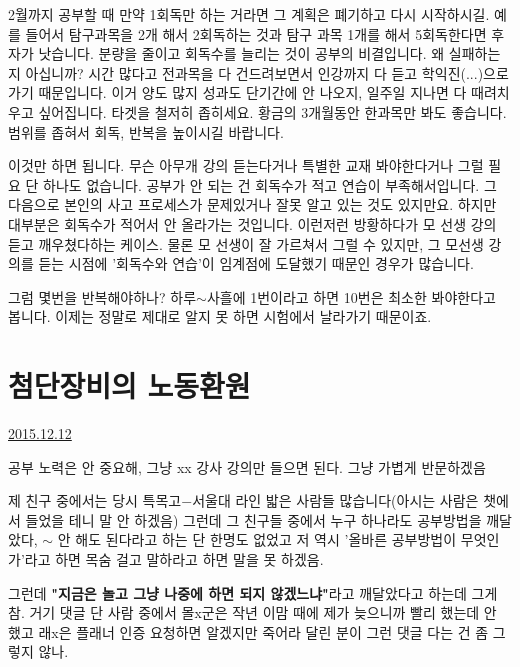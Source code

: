 2월까지 공부할 때 만약 1회독만 하는 거라면 그 계획은 폐기하고 다시 시작하시길.
예를 들어서 탐구과목을 2개 해서 2회독하는 것과 탐구 과목 1개를 해서 5회독한다면 후자가 낫습니다.
분량을 줄이고 회독수를 늘리는 것이 공부의 비결입니다.
왜 실패하는지 아십니까? 시간 많다고 전과목을 다 건드려보면서 인강까지 다 듣고 학익진(...)으로 가기 때문입니다.
이거 양도 많지 성과도 단기간에 안 나오지, 일주일 지나면 다 때려치우고 싶어집니다.
타겟을 철저히 좁히세요. 황금의 3개월동안 한과목만 봐도 좋습니다. 범위를 좁혀서 회독, 반복을 높이시길 바랍니다.
\vspace{5mm}

이것만 하면 됩니다. 무슨 아무개 강의 듣는다거나 특별한 교재 봐야한다거나 그럴 필요 단 하나도 없습니다.
공부가 안 되는 건 회독수가 적고 연습이 부족해서입니다. 그 다음으로 본인의 사고 프로세스가 문제있거나 잘못 알고 있는 것도 있지만요.
하지만 대부분은 회독수가 적어서 안 올라가는 것입니다.
이런저런 방황하다가 모 선생 강의 듣고 깨우쳤다하는 케이스.
물론 모 선생이 잘 가르쳐서 그럴 수 있지만, 그 모선생 강의를 듣는 시점에 '회독수와 연습'이 임계점에 도달했기 때문인 경우가 많습니다.
\vspace{5mm}

그럼 몇번을 반복해야하나?
하루$\sim$사흘에 1번이라고 하면 10번은 최소한 봐야한다고 봅니다.
이제는 정말로 제대로 알지 못 하면 시험에서 날라가기 때문이죠.
\vspace{5mm}







\section{첨단장비의 노동환원}
\href{https://www.kockoc.com/Apoc/540961}{2015.12.12}

\vspace{5mm}

공부 노력은 안 중요해, 그냥 xx 강사 강의만 들으면 된다.
그냥 가볍게 반문하겠음
\vspace{5mm}

제 친구 중에서는 당시 특목고$-$서울대 라인 밟은 사람들 많습니다(아시는 사람은 챗에서 들었을 테니 말 안 하겠음)
그런데 그 친구들 중에서 누구 하나라도 공부방법을 깨달았다, $\sim$ 안 해도 된다라고 하는 단 한명도 없었고
저 역시 '올바른 공부방법이 무엇인가'라고 하면 목숨 걸고 말하라고 하면 말을 못 하겠음.
\vspace{5mm}

그런데 \textbf{"지금은 놀고 그냥 나중에 하면 되지 않겠느냐"}라고 깨달았다고 하는데 그게 참.
거기 댓글 단 사람 중에서 몰x군은 작년 이맘 때에 제가 늦으니까 빨리 했는데 안 했고
래x은 플래너 인증 요청하면 알겠지만 죽어라 달린 분이 그런 댓글 다는 건 좀 그렇지 않나.
\vspace{5mm}

